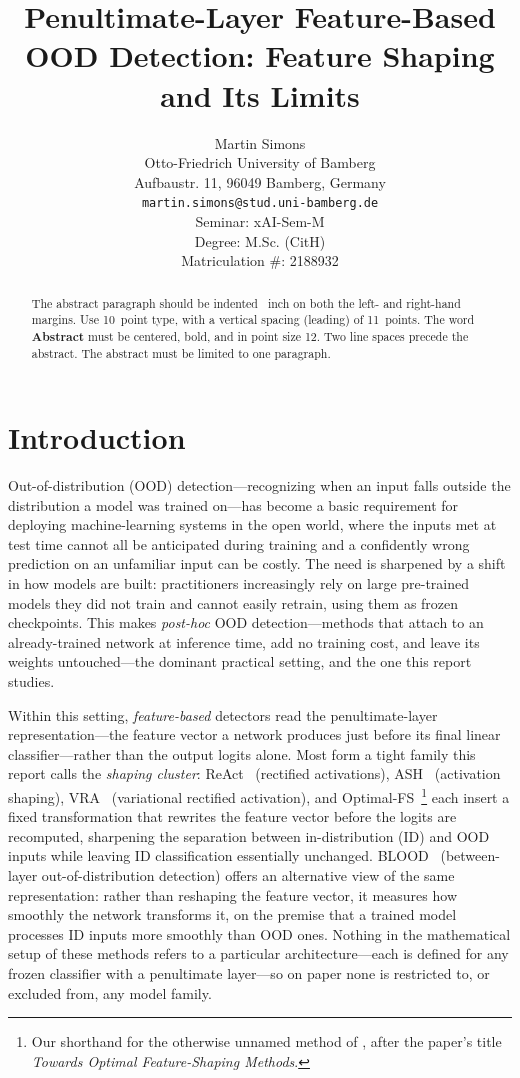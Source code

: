\documentclass[a4paper]{article}
\title{Penultimate-Layer Feature-Based OOD Detection: Feature Shaping and Its Limits}
\author{%
  Martin Simons\\
  Otto-Friedrich University of Bamberg\\
  Aufbaustr. 11, 96049 Bamberg, Germany\\
  \texttt{martin.simons@stud.uni-bamberg.de} \\[0.5cm]
  Seminar: xAI-Sem-M \\
  Degree: M.Sc. (CitH) \\
  Matriculation \#: 2188932
}
\begin{document}
\maketitle
\def\va{{\bm{a}}}

\begin{abstract}
  The abstract paragraph should be indented ~inch on
  both the left- and right-hand margins. Use 10~point type, with a vertical
  spacing (leading) of 11~points.  The word \textbf{Abstract} must be centered,
  bold, and in point size 12. Two line spaces precede the abstract. The abstract
  must be limited to one paragraph.
\end{abstract}


\section{Introduction}
\label{intro}


Out-of-distribution (OOD) detection---recognizing when an input falls outside the
distribution a model was trained on---has become a basic requirement for deploying
machine-learning systems in the open world, where the inputs met at test time cannot
all be anticipated during training and a confidently wrong prediction on an unfamiliar
input can be costly. The need is sharpened by a shift in how models are built:
practitioners increasingly rely on large pre-trained models they did not train and
cannot easily retrain, using them as frozen checkpoints. This makes \emph{post-hoc}
OOD detection---methods that attach to an already-trained network at inference time,
add no training cost, and leave its weights untouched---the dominant practical setting,
and the one this report studies.

Within this setting, \emph{feature-based} detectors read the penultimate-layer
representation---the feature vector a network produces just before its final linear
classifier---rather than the output logits alone. Most form a tight family this report
calls the \emph{shaping cluster}: ReAct~\citep{react} (rectified activations),
ASH~\citep{ash} (activation shaping), VRA~\citep{vra} (variational rectified
activation), and Optimal-FS~\citep{optimalfs}\footnote{Our shorthand for the otherwise
unnamed method of \citet{optimalfs}, after the paper's title \emph{Towards Optimal
Feature-Shaping Methods}.} each insert a fixed transformation that rewrites the feature
vector before the logits are recomputed, sharpening the separation between
in-distribution (ID) and OOD inputs while leaving ID classification essentially
unchanged. BLOOD~\citep{blood} (between-layer out-of-distribution detection) offers an
alternative view of the same representation: rather than reshaping the feature vector,
it measures how smoothly the network transforms it, on the premise that a trained model
processes ID inputs more smoothly than OOD ones. Nothing in the mathematical setup of
these methods refers to a particular architecture---each is defined for any frozen
classifier with a penultimate layer---so on paper none is restricted to, or excluded
from, any model family.
\end{document}
